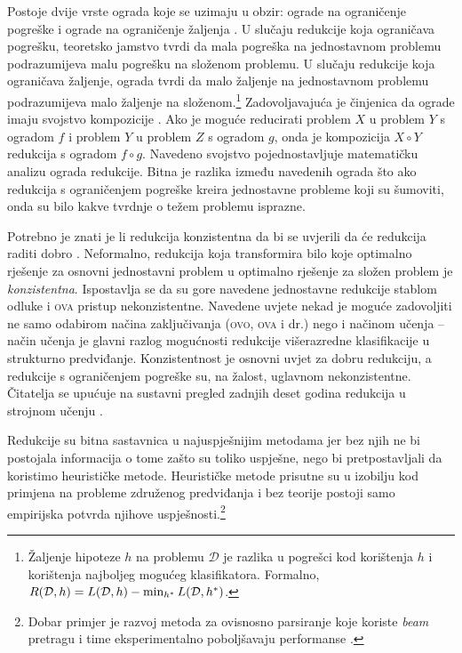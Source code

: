 Postoje dvije vrste ograda koje se uzimaju u obzir: ograde na ograničenje
pogreške  i ograde na ograničenje žaljenja . U slučaju redukcije koja ograničava pogrešku, teoretsko jamstvo tvrdi
da mala pogreška na jednostavnom problemu podrazumijeva malu pogrešku na složenom
problemu. U slučaju redukcije koja ograničava žaljenje, ograda tvrdi da malo
žaljenje na jednostavnom problemu podrazumijeva malo žaljenje na
složenom.\footnote{Žaljenje hipoteze $h$ na problemu $\mathcal{D}$ je razlika u
pogrešci kod korištenja $h$ i korištenja najboljeg mogućeg klasifikatora.
Formalno, $R(\mathcal{D}, h) = L(\mathcal{D}, h) - \min_{h\ssymbol{1}}
L(\mathcal{D}, h\ssymbol{1})$.} Zadovoljavajuća je činjenica da ograde imaju
svojstvo kompozicije \citep{beygelzimer2005error}. Ako je moguće reducirati
problem $X$ u problem $Y$ s ogradom $f$ i problem $Y$ u problem $Z$ s ogradom
$g$, onda je kompozicija $X \circ Y$ redukcija s ogradom $f \circ g$. Navedeno
svojstvo pojednostavljuje matematičku analizu ograda redukcije. Bitna je razlika
između navedenih ograda što ako redukcija s ograničenjem pogreške kreira
jednostavne probleme koji su šumoviti, onda su bilo kakve tvrdnje o težem
problemu isprazne.

Potrebno je znati je li redukcija konzistentna  da bi se
uvjerili da će redukcija raditi dobro \citep{beygelzimer2009error,
daume15reductions}. Neformalno, redukcija koja transformira bilo koje optimalno
rješenje za osnovni jednostavni problem u optimalno rješenje za složen
problem je \textit{konzistentna}. Ispostavlja se da su gore navedene jednostavne
redukcije stablom odluke i \textsc{ova} pristup nekonzistentne. Navedene uvjete
nekad je moguće zadovoljiti ne samo odabirom načina zaključivanja (\textsc{ovo},
\textsc{ova} i dr.) nego i načinom učenja \citep{abe2004iterative,
beygelzimer2005weighted} -- način učenja je glavni razlog mogućnosti redukcije
višerazredne klasifikacije u strukturno predviđanje. Konzistentnost je osnovni
uvjet za dobru redukciju, a redukcije s ograničenjem pogreške su, na žalost,
uglavnom nekonzistentne. Čitatelja se upućuje na sustavni pregled zadnjih deset
godina redukcija u strojnom učenju \citep{daume15reductions}.

Redukcije su bitna sastavnica u najuspješnijim \lts{} metodama jer bez njih ne
bi postojala informacija o tome zašto su toliko uspješne, nego bi
pretpostavljali da koristimo heurističke metode. Heurističke metode prisutne su
u izobilju kod primjena na probleme združenog predviđanja i bez teorije postoji
samo empirijska potvrda njihove uspješnosti.\footnote{Dobar primjer je razvoj
metoda za ovisnosno parsiranje koje koriste \textit{beam} pretragu i time
eksperimentalno poboljšavaju performanse \citep{zhang2011transition,
bohnet2012transition}.}
